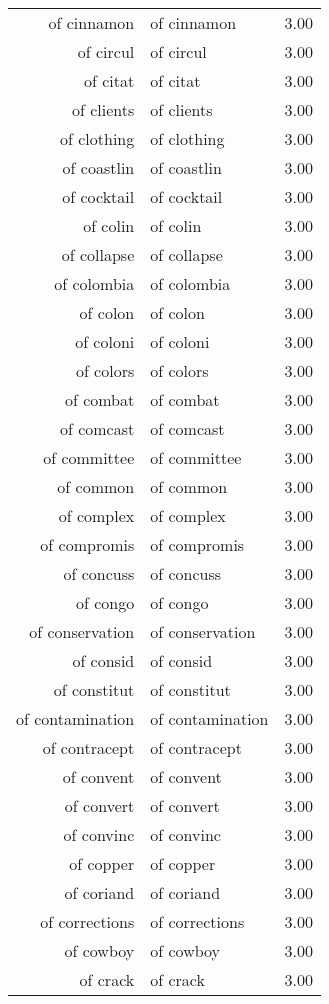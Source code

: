 \begin{table}[ht]
\begin{tabular}{rlr}
  of cinnamon & of cinnamon & 3.00 \\ 
  of circul & of circul & 3.00 \\ 
  of citat & of citat & 3.00 \\ 
  of clients & of clients & 3.00 \\ 
  of clothing & of clothing & 3.00 \\ 
  of coastlin & of coastlin & 3.00 \\ 
  of cocktail & of cocktail & 3.00 \\ 
  of colin & of colin & 3.00 \\ 
  of collapse & of collapse & 3.00 \\ 
  of colombia & of colombia & 3.00 \\ 
  of colon & of colon & 3.00 \\ 
  of coloni & of coloni & 3.00 \\ 
  of colors & of colors & 3.00 \\ 
  of combat & of combat & 3.00 \\ 
  of comcast & of comcast & 3.00 \\ 
  of committee & of committee & 3.00 \\ 
  of common & of common & 3.00 \\ 
  of complex & of complex & 3.00 \\ 
  of compromis & of compromis & 3.00 \\ 
  of concuss & of concuss & 3.00 \\ 
  of congo & of congo & 3.00 \\ 
  of conservation & of conservation & 3.00 \\ 
  of consid & of consid & 3.00 \\ 
  of constitut & of constitut & 3.00 \\ 
  of contamination & of contamination & 3.00 \\ 
  of contracept & of contracept & 3.00 \\ 
  of convent & of convent & 3.00 \\ 
  of convert & of convert & 3.00 \\ 
  of convinc & of convinc & 3.00 \\ 
  of copper & of copper & 3.00 \\ 
  of coriand & of coriand & 3.00 \\ 
  of corrections & of corrections & 3.00 \\ 
  of cowboy & of cowboy & 3.00 \\ 
  of crack & of crack & 3.00 \\ 

\end{tabular}
\end{table}
